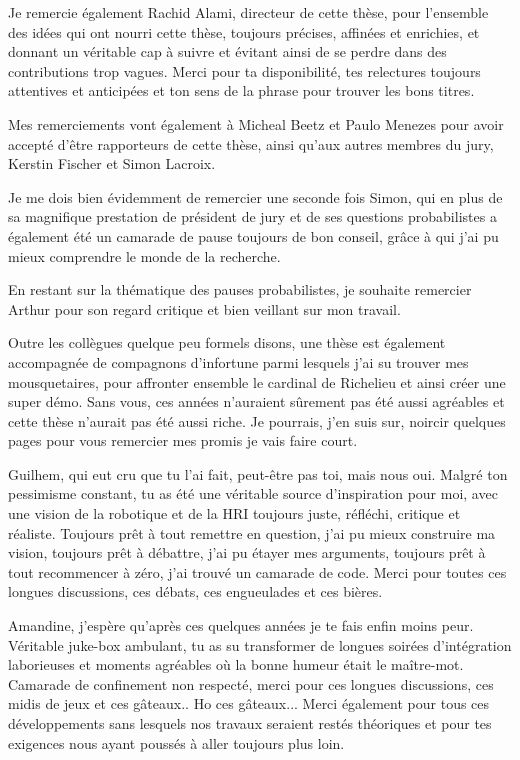 \documentclass[english,a4paper,11pt,twoside]{StyleThese}
\begin{document}
Je remercie également Rachid Alami, directeur de cette thèse, pour l'ensemble des idées qui ont nourri cette thèse, toujours précises, affinées et enrichies, et donnant un véritable cap à suivre et évitant ainsi de se perdre dans des contributions trop vagues. Merci pour ta disponibilité, tes relectures toujours attentives et anticipées et ton sens de la phrase pour trouver les bons titres.

Mes remerciements vont également à Micheal Beetz et Paulo Menezes pour avoir accepté d'être rapporteurs de cette thèse, ainsi qu'aux autres membres du jury, Kerstin Fischer et Simon Lacroix.

Je me dois bien évidemment de remercier une seconde fois Simon, qui en plus de sa magnifique prestation de président de jury et de ses questions probabilistes a également été un camarade de pause toujours de bon conseil, grâce à qui j'ai pu mieux comprendre le monde de la recherche.

En restant sur la thématique des pauses probabilistes, je souhaite remercier Arthur pour son regard critique et bien veillant sur mon travail.

Outre les collègues quelque peu formels disons, une thèse est également accompagnée de compagnons d'infortune parmi lesquels j'ai su trouver mes mousquetaires, pour affronter ensemble le cardinal de Richelieu et ainsi créer une super démo. Sans vous, ces années n'auraient sûrement pas été aussi agréables et cette thèse n'aurait pas été aussi riche. Je pourrais, j'en suis sur, noircir quelques pages pour vous remercier mes promis je vais faire court.

Guilhem, qui eut cru que tu l'ai fait, peut-être pas toi, mais nous oui. Malgré ton pessimisme constant, tu as été une véritable source d'inspiration pour moi, avec une vision de la robotique et de la HRI toujours juste, réfléchi, critique et réaliste. Toujours prêt à tout remettre en question, j'ai pu mieux construire ma vision, toujours prêt à débattre, j'ai pu étayer mes arguments, toujours prêt à tout recommencer à zéro, j'ai trouvé un camarade de code. Merci pour toutes ces longues discussions, ces débats, ces engueulades et ces bières.

Amandine, j'espère qu'après ces quelques années je te fais enfin moins peur. Véritable juke-box ambulant, tu as su transformer de longues soirées d'intégration laborieuses et moments agréables où la bonne humeur était le maître-mot. Camarade de confinement non respecté, merci pour ces longues discussions, ces midis de jeux et ces gâteaux.. Ho ces gâteaux... Merci également pour tous ces développements sans lesquels nos travaux seraient restés théoriques et pour tes exigences nous ayant poussés à aller toujours plus loin.
\end{document}
